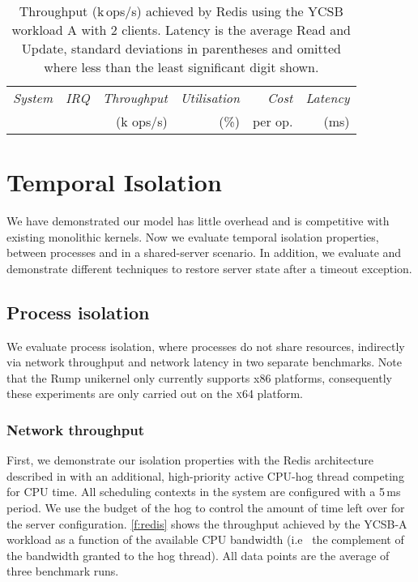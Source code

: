 \begin{table}[t]\centering
      \begin{tabularx}{\textwidth}{Xrrrrr}\toprule
          \emph{System}   & \emph{IRQ} & \emph{Throughput} & \emph{Utilisation} & \emph{Cost} & \emph{Latency} \\
                          &            & (k ops/s)         & (\%)               & per op.     & (ms)            \\
        \midrule

      
      \bottomrule
    \end{tabularx}
    \caption[Results of Redis throughput benchmark.]{Throughput (k\,ops/s) achieved by Redis using the YCSB
      workload A with 2 clients.  Latency is the average Read and Update,
      standard deviations in parentheses and omitted where less than the least
      significant digit shown.}
    \label{t:redis}
\end{table}

\section{Temporal Isolation}

We have demonstrated our model has little overhead and is competitive with existing monolithic
kernels. Now we evaluate temporal isolation properties, between processes and in a shared-server
scenario. 
In addition, we evaluate and demonstrate different
techniques to restore server state after a timeout exception.

\subsection{Process isolation} 

We evaluate process isolation, where processes do not share resources, indirectly via network
throughput and network latency in two separate benchmarks. Note that the Rump unikernel only
currently supports x86 platforms, consequently these experiments are only carried out on
the \textsc{x64} platform. 

\subsubsection{Network throughput}

First, we demonstrate our isolation properties with the Redis architecture described in
 with an additional, high-priority active CPU-hog thread
competing for \gls{CPU} time.  All scheduling contexts in the system are configured with a
5\,ms period. We use the budget of the hog to control the amount of time left over
for the server configuration. \autoref{f:redis} shows the throughput
achieved by the YCSB-A workload as a function of the available CPU
bandwidth (i.e \ the complement of the bandwidth granted to the hog
thread). All data points are the average of three benchmark runs.

